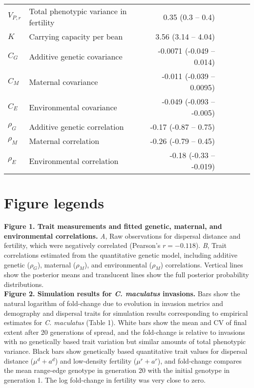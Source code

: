 \documentclass[11pt]{article}
\begin{document}
\begin{table}[h]
\begin{tabularx}{0.95\linewidth}{lXrrrrr}
$V_{P,r}$   & Total phenotypic variance in fertility    &  0.35 (0.3 -- 0.4) \\
$K$         & Carrying capacity per bean   &  3.56 (3.14 -- 4.04)  \\ \midrule
$C_{G}$     & Additive genetic covariance &  -0.0071 (-0.049 -- 0.014) \\
$C_{M}$     & Maternal covariance & -0.011 (-0.039 -- 0.0095) \\
$C_{E}$     & Environmental covariance   & -0.049 (-0.093 -- -0.005)  \\
$\rho_{G}$  & Additive genetic correlation  &  -0.17 (-0.87 -- 0.75)\\
$\rho_{M}$  & Maternal correlation  &  -0.26 (-0.79 -- 0.45) \\
$\rho_{E}$  & Environmental correlation     &  -0.18 (-0.33 -- -0.019) \\
\bottomrule
\end{tabularx}
\end{table}


\newpage{}
\section*{Figure legends}

\noindent{} \textbf{Figure 1. Trait measurements and fitted genetic, maternal, and environmental correlations.} \textit{A}, Raw observations for dispersal distance and fertility, which were negatively correlated (Pearson's $r = -0.118$). \textit{B}, Trait correlations estimated from the quantitative genetic model, including additive genetic ($\rho_{G}$), maternal ($\rho_{M}$), and environmental ($\rho_{M}$) correlations. Vertical lines show the posterior means and translucent lines show the full posterior probability distributions.\\

\noindent{} \textbf{Figure 2. Simulation results for \textit{C. maculatus} invasions.} Bars show the natural logarithm of fold-change due to evolution in invasion metrics and demography and dispersal traits for simulation results corresponding to empirical estimates for \textit{C. maculatus} (Table 1).
White bars show the mean and CV of final extent after 20 generations of spread, and the fold-change is relative to invasions with no genetically based trait variation but similar amounts of total phenotypic variance.
Black bars show genetically based quantitative trait values for dispersal distance ($\mu^{d} + a^{d}$) and low-density fertility ($\mu^{r} + a^{r}$), and fold-change compares the mean range-edge genotype in generation 20 with the initial genotype in generation 1.
The log fold-change in fertility was very close to zero.\\
\end{document}
